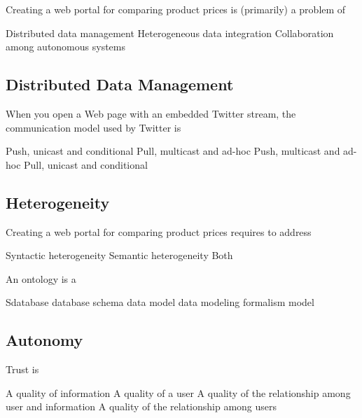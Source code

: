 \documentclass[12pt,a4paper,answers]{exam} %
\begin{document}
\begin{flushleft}
\begin{multicols*}{2}
\begin{questions}
\question Creating a web portal for comparing product prices is (primarily) a problem of
\begin{checkboxes}
\choice Distributed data management
\choice Heterogeneous data integration
\choice Collaboration among autonomous systems
\end{checkboxes}

\subsection{Distributed Data Management}

\question When you open a Web page with an embedded Twitter stream, the communication model used by Twitter is
\begin{checkboxes}
\choice Push, unicast and conditional
\choice Pull, multicast and ad-hoc
\choice Push, multicast and ad-hoc
\choice Pull, unicast and conditional
\end{checkboxes}

\subsection{Heterogeneity}

\question Creating a web portal for comparing product prices requires to address
\begin{checkboxes}
\choice Syntactic heterogeneity
\choice Semantic heterogeneity
\choice Both
\end{checkboxes}

\question An ontology is a
\begin{checkboxes}
\choice Sdatabase
\choice database schema
\choice data model
\choice data modeling formalism
\choice model
\end{checkboxes}

\subsection{Autonomy}

\question Trust is
\begin{checkboxes}
\choice A quality of information
\choice A quality of a user
\choice A quality of the relationship among user and information
\choice A quality of the relationship among users
\end{checkboxes}



\end{questions}
\end{multicols*}
\end{flushleft}
\end{document}
